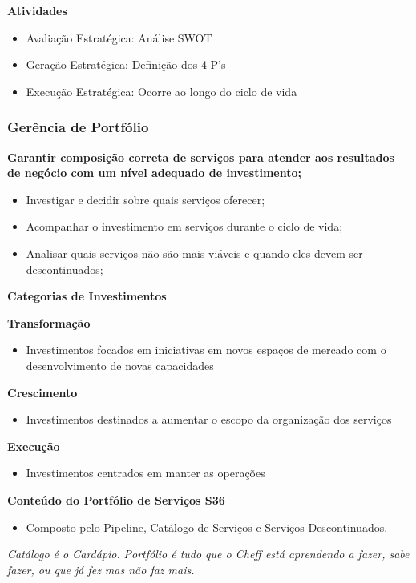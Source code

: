 \textbf{Atividades}
\begin{itemize}
	\item Avaliação Estratégica: Análise SWOT
	\item Geração Estratégica: Definição dos 4 P's
	\item Execução Estratégica: Ocorre ao longo do ciclo de vida
\end{itemize}

\subsubsection{Gerência de Portfólio}

\textbf{Garantir composição correta de serviços para atender aos resultados de negócio com um nível adequado de investimento;}
\begin{itemize}
	\item Investigar e decidir sobre quais serviços oferecer;
	\item Acompanhar o investimento em serviços durante o ciclo de vida;
	\item Analisar quais serviços não são mais viáveis e quando eles devem ser descontinuados;
\end{itemize}

\textbf{Categorias de Investimentos} 

\textbf{Transformação}
\begin{itemize}
	\item Investimentos focados em iniciativas em novos espaços de mercado com o desenvolvimento de novas capacidades
\end{itemize}

\textbf{Crescimento}
\begin{itemize}
	\item Investimentos destinados a aumentar o escopo da organização dos serviços
\end{itemize}

\textbf{Execução}
\begin{itemize}
	\item Investimentos centrados em manter as operações
\end{itemize}

\textbf{Conteúdo do Portfólio de Serviços S36}
\begin{itemize}
	\item Composto pelo Pipeline, Catálogo de Serviços e Serviços Descontinuados.
\end{itemize}

\begin{center}
	\emph{Catálogo é o Cardápio.}
	\emph{Portfólio é tudo que o Cheff está aprendendo a fazer, sabe fazer, ou que já fez mas não faz mais.}
\end{center}

